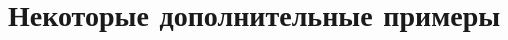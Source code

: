 \chapter{Некоторые дополнительные примеры}\label{appendix-extra-examples}							%

%
%
%
%
%
%
%
%
%
